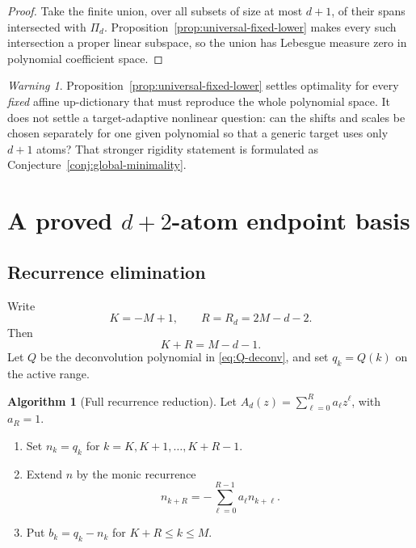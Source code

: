 \documentclass[11pt,oneside]{article}
\theoremstyle{definition}
\newtheorem{algorithm}[theorem]{Algorithm}
\theoremstyle{remark}
\newtheorem{warning}[theorem]{Warning}
\begin{document}
\begin{proof}
Take the finite union, over all subsets of size at most $d+1$, of their spans intersected with $\Pi_d$.  Proposition~\ref{prop:universal-fixed-lower} makes every such intersection a proper linear subspace, so the union has Lebesgue measure zero in polynomial coefficient space.
\end{proof}

\begin{warning}
Proposition~\ref{prop:universal-fixed-lower} settles optimality for every \emph{fixed} affine up-dictionary that must reproduce the whole polynomial space.  It does not settle a target-adaptive nonlinear question: can the shifts and scales be chosen separately for one given polynomial so that a generic target uses only $d+1$ atoms?  That stronger rigidity statement is formulated as Conjecture~\ref{conj:global-minimality}.
\end{warning}

\section{A proved \texorpdfstring{$d+2$}{d+2}-atom endpoint basis}
\label{sec:endpoint-basis}

\subsection{Recurrence elimination}
Write
\begin{equation}
 K=-M+1,\qquad R=R_d=2M-d-2.                              \label{eq:K-R}
\end{equation}
Then
\begin{equation}
 K+R=M-d-1.                                                \label{eq:first-endpoint}
\end{equation}
Let $Q$ be the deconvolution polynomial in \eqref{eq:Q-deconv}, and set $q_k=Q(k)$ on the active range.

\begin{algorithm}[Full recurrence reduction]
\label{alg:slow}
Let $A_d(z)=\sum_{\ell=0}^{R}a_\ell z^\ell$, with $a_R=1$.
\begin{enumerate}
\item Set $n_k=q_k$ for $k=K,K+1,\ldots,K+R-1$.
\item Extend $n$ by the monic recurrence
\begin{equation}
 n_{k+R}=-\sum_{\ell=0}^{R-1}a_\ell n_{k+\ell}.           \label{eq:recurrence-extension}
\end{equation}
\item Put $b_k=q_k-n_k$ for $K+R\le k\le M$.
\end{enumerate}
\end{algorithm}
\end{document}
